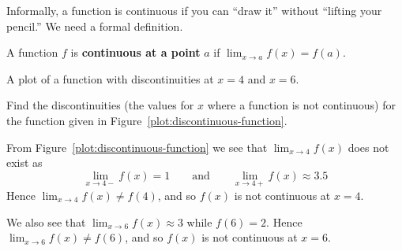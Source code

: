 Informally, a function is continuous if you can ``draw it'' without
``lifting your pencil.'' We need a formal definition.

\begin{definition} A function $f$ is \textbf{continuous
at a point} $a$ if $\lim_{x\to a} f(x) = f(a)$.  
\end{definition}
\begin{marginfigure}[0in]
\caption{A plot of a function with discontinuities at $x=4$ and $x=6$.}
\label{plot:discontinuous-function}
\end{marginfigure}

\begin{example}
Find the discontinuities (the values for $x$ where a function is not
continuous) for the function given in Figure~\ref{plot:discontinuous-function}.
\end{example}
\begin{solution}
From Figure~\ref{plot:discontinuous-function} we see that $\lim_{x\to 4} f(x)$ does not exist as
\[
\lim_{x\to 4-}f(x) = 1\qquad\text{and}\qquad \lim_{x\to 4+}f(x) \approx 3.5
\]
Hence $\lim_{x\to 4} f(x) \ne f(4)$, and so $f(x)$ is not
continuous at $x=4$.

We also see that $\lim_{x\to 6} f(x) \approx 3$ while $f(6) =
2$. Hence $\lim_{x\to 6} f(x) \ne f(6)$, and so $f(x)$ is not
continuous at $x=6$.
\end{solution}

